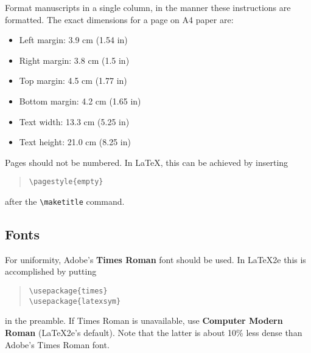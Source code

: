 \documentclass[]{article}
\begin{document}
Format manuscripts in a single column, in the manner these
instructions are formatted. The exact dimensions for a page on
A4 paper are:
\begin{itemize}
\item Left margin: 3.9 cm (1.54 in)
\item Right margin: 3.8 cm (1.5 in)
\item Top margin: 4.5 cm (1.77 in)
\item Bottom margin: 4.2 cm (1.65 in)
\item Text width: 13.3 cm (5.25 in)
\item Text height: 21.0 cm (8.25 in)
\end{itemize}

Pages should not be numbered. In LaTeX, this can be achieved by
inserting
\begin{quote}
\begin{verbatim}
\pagestyle{empty}
\end{verbatim}
\end{quote}
after the \verb=\maketitle= command.

\subsection{Fonts}

For uniformity, Adobe's {\bf Times Roman} font should be
used. In \LaTeX2e{} this is accomplished by putting

\begin{quote}
\begin{verbatim}
\usepackage{times}
\usepackage{latexsym}
\end{verbatim}
\end{quote}
in the preamble. If Times Roman is unavailable, use {\bf Computer
  Modern Roman} (\LaTeX2e{}'s default).  Note that the latter is about
  10\% less dense than Adobe's Times Roman font.
\end{document}
